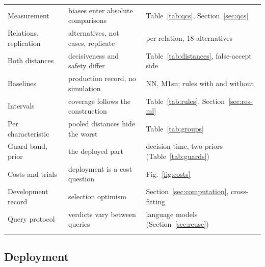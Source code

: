 \documentclass[pdflatex,sn-basic,lineno]{sn-jnl}
\providecommand{\DIFaddendFL}{} %
\DeclareRobustCommand{\DIFaddendFL}{\DIFOaddendFL \let\includegraphics\DIFOincludegraphics} %
\begin{document}
\begin{table}[t]
\begin{tabular}{@{}L{2.7cm}L{4.7cm}L{5.0cm}@{}}
Measurement & biases enter absolute comparisons & Table~\ref{tab:qcs}, Section~\ref{sec:qcs} \\
Relations, replication & alternatives, not cases, replicate & per relation, 18 alternatives \\
Both distances & decisiveness and safety differ & Table~\ref{tab:distances}, false-accept side \\
Baselines & production record, no simulation & NN, M1sn; rules with and without \\
Intervals & coverage follows the construction & Table~\ref{tab:rules}, Section~\ref{sec:res-ml} \\
Per characteristic & pooled distances hide the worst & Table~\ref{tab:groups} \\
Guard band, prior & the deployed part & decision-time, two priors (Table~\ref{tab:guards}) \\
Costs and trials & deployment is a cost question & Fig.~\ref{fig:costs} \\
Development record & selection optimism & Section~\ref{sec:computation}, cross-fitting \\
Query protocol & verdicts vary between queries & language models (Section~\ref{sec:reuse}) \\
\botrule
\end{tabular}
\DIFaddendFL \end{table}

\subsection{Deployment}
\end{document}
